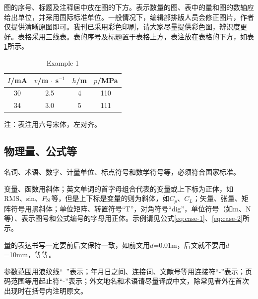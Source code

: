 \documentclass{kqdlxxb}
\begin{document}
图的序号、标题及注释居中放在图的下方。表示数量的图、表中的量和图的数轴应给出单位，并采用国际标准单位。一般情况下，编辑部排版人员会修正图片，作者仅提供清晰原图即可。我刊已采用彩色印刷，请大家尽量提供彩色图，辨识度更好。表格采用三线表。表的序号及标题置于表格上方，表注放在表格的下方，如表\ref{tab:case-1}所示。
\begin{table}[htb]
    \centering
    \renewcommand{\tablename}{表}
    \caption{示例表格}
    \addtocounter{table}{-1}
    \vspace{-4pt}
    \caption{Example 1}
      \label{tab:case-1}
      \begin{threeparttable}
      \begin{tabular}{cccc}
          \toprule
          $I$/mA& $v$/m $\cdot$ s$^{-1}$& $h$/m& $p$/MPa \\
          \midrule
          30& 2.5& 4& 110 \\
          34& 3.0& 5& 111 \\
          \bottomrule
      \end{tabular}
      \begin{tablenotes}
        \footnotesize
        \item 注：表注用六号宋体，左对齐。  %
      \end{tablenotes}
    \end{threeparttable}
\end{table}


\subsection{物理量、公式等}

名词、术语、数字、计量单位、标点符号和数学符号等，必须符合国家标准。

变量、函数用斜体；英文单词的首字母组合代表的变量或上下标为正体，如RMS、sin、$F_{\rm N}$等，但是上下标是变量的则为斜体，如$C_p$、$C_L$；矢量、张量、矩阵符号用黑斜体；单位矩阵、转置符号“T”，对角符号“dig”，单位符号（如m、N等）、表示图号和公式编号的字母用正体。示例请见公式\eqref{eq:case-1}、\eqref{eq:case-2}所示。

量的表达书写一定要前后文保持一致，如前文用$d$=0.01m，后文就不要用$d$=10mm，等等。

参数范围用浪纹线“~”表示；年月日之间、连接词、文献号等用连接符“-”表示；页码范围等用起止符“-”表示；外文地名和术语请尽量译成中文，除常见者外在首次出现时在括号内注明原文。
\end{document}
